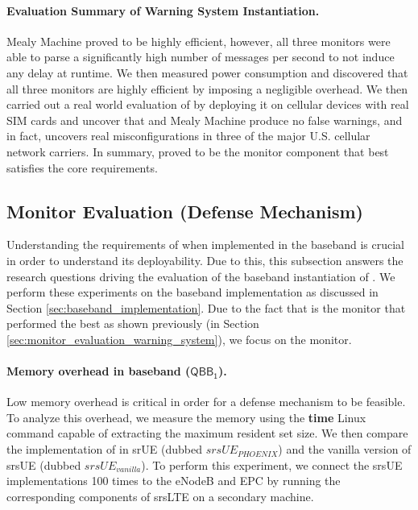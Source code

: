 \paragraph{Evaluation Summary of Warning System Instantiation.}
Mealy Machine proved to be highly efficient, however,
all three monitors were able to parse a significantly high number of messages per second to not
induce any delay at runtime. We then measured power consumption and
discovered that all three monitors are highly efficient by imposing a negligible
overhead. We then carried
out a real world evaluation of \system by deploying it on cellular devices with
real SIM cards and uncover that \pltl and Mealy Machine produce no false warnings,
and in fact, \pltl uncovers real misconfigurations in three of the major U.S. cellular
network carriers. In summary,
\pltl proved to be the monitor component that best satisfies the core
requirements.

\subsection{Monitor Evaluation (Defense Mechanism)}
Understanding the requirements of \system when implemented in the baseband
is crucial in order to understand its deployability. Due to this,
this subsection answers the research questions driving the evaluation of the
baseband instantiation of \system. We perform these experiments on the baseband
implementation as discussed in Section \ref{sec:baseband_implementation}.
Due to the fact that \pltl is the monitor that performed the best as shown
previously (in Section \ref{sec:monitor_evaluation_warning_system}), we focus
on the \pltl monitor.

\paragraph{Memory overhead in baseband ($\mathsf{QBB_1}$).}
Low memory overhead is critical in order for a defense mechanism to be
feasible. To analyze this overhead, we measure the
memory using the \textbf{time} Linux command capable of extracting the maximum
resident set size. We then compare the implementation
of \system in srUE (dubbed $srsUE_{PHOENIX}$) and the vanilla version of srsUE
(dubbed $srsUE_{vanilla}$). To perform this experiment, we connect the srsUE
implementations 100 times to the eNodeB and EPC by running the corresponding
components of srsLTE \cite{gomez2016srslte} on a secondary machine.

